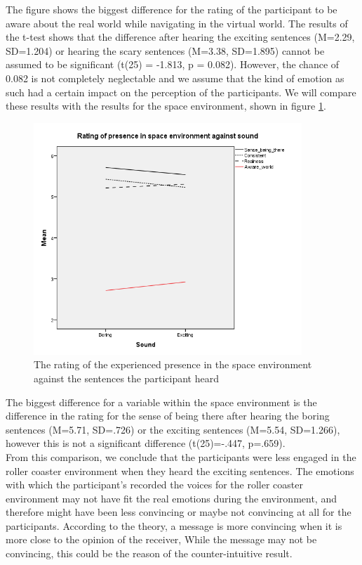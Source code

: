 \documentclass[Results.tex]{subfiles}
\begin{document}
The figure shows the biggest difference for the rating of the participant to be aware about the real world while navigating in the virtual world. The results of the t-test shows that the difference after hearing the exciting sentences (M=2.29, SD=1.204) or hearing the scary sentences (M=3.38, SD=1.895) cannot be assumed to be significant (t(25) = -1.813, p = 0.082). However, the chance of 0.082 is not completely neglectable and we assume that the kind of emotion as such had a certain impact on the perception of the participants. We will compare these results with the results for the space environment, shown in figure \ref{fig:Ratings_presence_BM}.

\begin{figure}[H]
	\centering
		\includegraphics[width=0.90\textwidth]{Section_1/Figures/Ratings_presence_BM.png}
	\caption{The rating of the experienced presence in the space environment against the sentences the participant heard}
	\label{fig:Ratings_presence_BM}
\end{figure}

The biggest difference for a variable within the space environment is the difference in the rating for the sense of being there after hearing the boring sentences (M=5.71, SD=.726) or the exciting sentences (M=5.54, SD=1.266), however this is not a significant difference (t(25)=-.447, p=.659).\\

From this comparison, we conclude that the participants were less engaged in the roller coaster environment when they heard the exciting sentences. The emotions with which the participant’s recorded the voices for the roller coaster environment may not have fit the real emotions during the environment, and therefore might have been less convincing or maybe not convincing at all for the participants. According to the theory, a message is more convincing when it is more close to the opinion of the receiver, While the message may not be convincing, this could be the reason of the counter-intuitive result. \\
\end{document}
